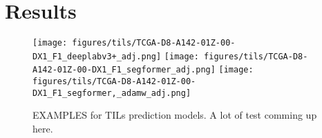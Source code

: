 \chapter{Results}
\begin{figure}

\texttt{[image: figures/tils/TCGA-D8-A142-01Z-00-DX1\_F1\_deeplabv3+\_adj.png]}
\texttt{[image: figures/tils/TCGA-D8-A142-01Z-00-DX1\_F1\_segformer\_adj.png]}
\texttt{[image: figures/tils/TCGA-D8-A142-01Z-00-DX1\_F1\_segformer,\_adamw\_adj.png]}

\caption{EXAMPLES for TILs prediction models. A lot of test comming up here.}
\label{fig:figure3}

\end{figure}